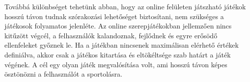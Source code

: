 Továbbá különbséget tehetünk abban, hogy az online felületen játszható játékok hosszú távon tudnak szórakozási lehetőséget biztosítani, nem szükséges a játékosok folyamatos jelenléte. 
Az online szerepjátékokban jellemzően nincs kitűzött végcél, a felhasználók kalandoznak, fejlődnek és egyre erősödő ellenfeleket győznek le. 
Ha a játékban nincsenek maximálisan elérhető értékek definiálva, akkor  csak a játékos kitartása és eltökéltsége szab határt a játék végének. 
A cél egy olyan játék megvalósítása volt, ami hosszú távon képes ösztönözni a felhasználót a sportolásra.

\newpage







